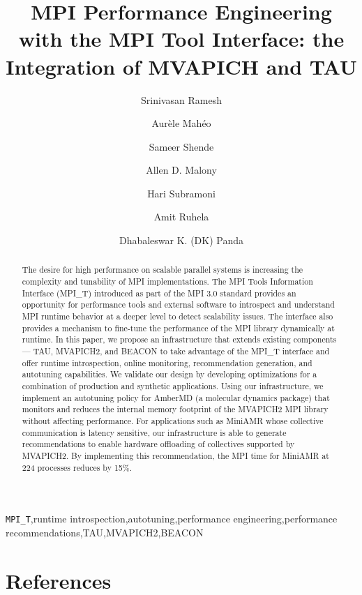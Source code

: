 \documentclass[preprint]{elsarticle}
\begin{document}
\begin{frontmatter}

\title{MPI Performance Engineering with the MPI Tool Interface: the Integration of MVAPICH and TAU}

\author[uoaddress]{Srinivasan Ramesh}

\author[uoaddress]{Aur\`{e}le Mah\'{e}o}

\author[uoaddress]{Sameer Shende}

\author[uoaddress]{Allen D. Malony}

\author[osuaddress]{Hari Subramoni}

\author[osuaddress]{Amit Ruhela}

\author[osuaddress]{Dhabaleswar K. (DK) Panda}

\address[uoaddress]{Dept of Computer and Information Science, University of Oregon, 1477 E 13th Ave, Eugene, Oregon 97403, USA}
\address[osuaddress]{Dept of Computer Science and Engineering, The Ohio State University, 2015 Neil Ave, Columbus, Ohio 43210, USA}

\begin{abstract}
The desire for high performance on scalable parallel systems is increasing the complexity and tunability of MPI implementations. The MPI Tools Information Interface (MPI\_T) introduced as part of the MPI 3.0 standard provides an opportunity for performance tools and external software to introspect and understand MPI runtime behavior at a deeper level to detect scalability issues. The interface also provides a mechanism to fine-tune the performance of the MPI library dynamically at runtime.
In this paper, we propose an infrastructure that extends existing components --- TAU, MVAPICH2, and BEACON to take advantage of the MPI\_T interface and offer runtime introspection, online monitoring, recommendation generation, and autotuning capabilities.
We validate our design by developing optimizations for a combination of production and synthetic applications. 
Using our infrastructure, we implement an autotuning policy for AmberMD (a molecular dynamics package) that monitors and reduces the internal memory footprint of the MVAPICH2 MPI library without affecting performance.
For applications such as MiniAMR whose collective communication is latency sensitive, our infrastructure is able to generate recommendations to enable hardware offloading of collectives supported by MVAPICH2. By implementing this recommendation, the MPI time for MiniAMR at 224 processes reduces by 15\%.
\end{abstract}

\begin{keyword}
	\texttt{MPI\_T}\sep runtime introspection\sep autotuning\sep performance engineering\sep performance recommendations\sep TAU\sep MVAPICH2\sep BEACON
\end{keyword}

\end{frontmatter}

\linenumbers



\section*{References}


\end{document}

